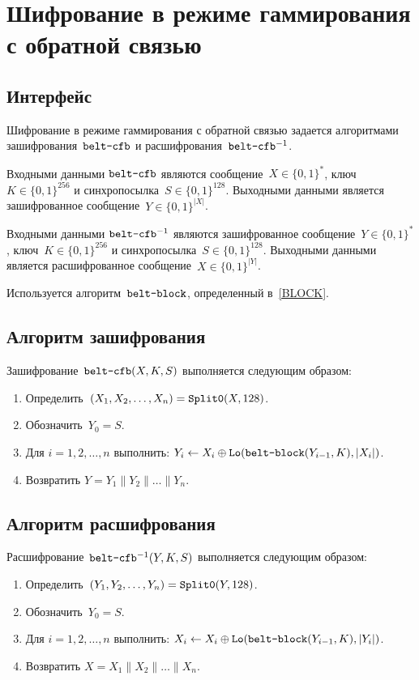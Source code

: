 \section{Шифрование в режиме гаммирования с обратной связью}\label{CFB}

\subsection{Интерфейс}\label{CFB.IFace}

Шифрование в режиме гаммирования с обратной связью задается алгоритмами 
зашифрования~$\texttt{belt-cfb}$ и расшифрования~$\texttt{belt-cfb}^{-1}$.

Входными данными $\texttt{belt-cfb}$ являются сообщение~$X\in\{0,1\}^*$, 
ключ~$K\in\{0,1\}^{256}$ и синхропосылка~$S\in\{0,1\}^{128}$.
%
Выходными данными является зашифрованное сообщение~$Y\in\{0,1\}^{|X|}$.

Входными данными $\texttt{belt-cfb}^{-1}$ являются зашифрованное 
сообщение~$Y\in\{0,1\}^*$, ключ~$K\in\{0,1\}^{256}$ и 
синхропосылка~$S\in\{0,1\}^{128}$. 
%
Выходными данными является расшифрованное сообщение~$X\in\{0,1\}^{|Y|}$.

Используется алгоритм~$\texttt{belt-block}$, определенный в~\ref{BLOCK}.

\subsection{Алгоритм зашифрования}\label{CFB.Encr}

Зашифрование~$\texttt{belt-cfb}(X,K,S)$ выполняется следующим образом: 
\begin{enumerate}
\item
Определить~$(X_1,X_2,\ldots,X_n)=\mathop{\texttt{Split0}}\nolimits(X, 128)$.
\item
Обозначить~$Y_0=S$.
\item
Для $i=1,2,\ldots,n$ выполнить:
$Y_i\leftarrow X_i\oplus\mathop{\texttt{Lo}}\nolimits(\texttt{belt-block}(Y_{i-1},K), |X_i|)$.
\item
Возвратить
$Y=Y_1\parallel Y_2\parallel\ldots\parallel Y_n$.
\end{enumerate}

\subsection{Алгоритм расшифрования}\label{CFB.Decr}

Расшифрование~$\texttt{belt-cfb}^{-1}(Y,K,S)$ выполняется следующим образом: 
\begin{enumerate}
\item
Определить~$(Y_1,Y_2,\ldots,Y_n)=\mathop{\texttt{Split0}}\nolimits(Y, 128)$.
\item
Обозначить~$Y_0=S$.
\item
Для $i=1,2,\ldots,n$ выполнить: 
$X_i\leftarrow X_i\oplus\mathop{\texttt{Lo}}\nolimits(\texttt{belt-block}(Y_{i-1},K), |Y_i|)$.
\item
Возвратить
$X=X_1\parallel X_2\parallel\ldots\parallel X_n$.
\end{enumerate}
